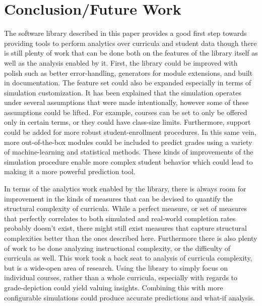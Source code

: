 \documentclass[botnum, fleqn]{unmeethesis}
\begin{document}



\chapter{Conclusion/Future Work}
  The software library described in this paper provides a good first step towards providing tools to perform analytics over curricula and student data though there is still plenty of work that can be done both on the features of the library itself as well as the analysis enabled by it. First, the library could be improved with polish such as better error-handling, generators for module extensions, and built in documentation. The feature set could also be expanded especially in terms of simulation customization. It has been explained that the simulation operates under several assumptions that were made intentionally, however some of these assumptions could be lifted. For example, courses can be set to only be offered only in certain terms, or they could have class-size limits. Furthermore, support could be added for more robust student-enrollment procedures. In this same vein, more out-of-the-box modules could be included to predict grades using a variety of machine-learning and statistical methods. These kinds of improvements of the simulation procedure enable more complex student behavior which could lead to making it a more powerful prediction tool.

  In terms of the analytics work enabled by the library, there is always room for improvement in the kinds of measures that can be devised to quantify the structural complexity of curricula. While a perfect measure, or set of measures that perfectly correlates to both simulated and real-world completion rates probably doesn't exist, there might still exist measures that capture structural complexities better than the ones described here. Furthermore there is also plenty of work to be done analyzing instructional complexity, or the difficulty of curricula as well. This work took a back seat to analysis of curricula complexity, but is a wide-open area of research. Using the library to simply focus on individual courses, rather than a whole curricula, especially with regards to grade-depiction could yield valuing insights. Combining this with more configurable simulations could produce accurate predictions and what-if analysis.
\end{document}
